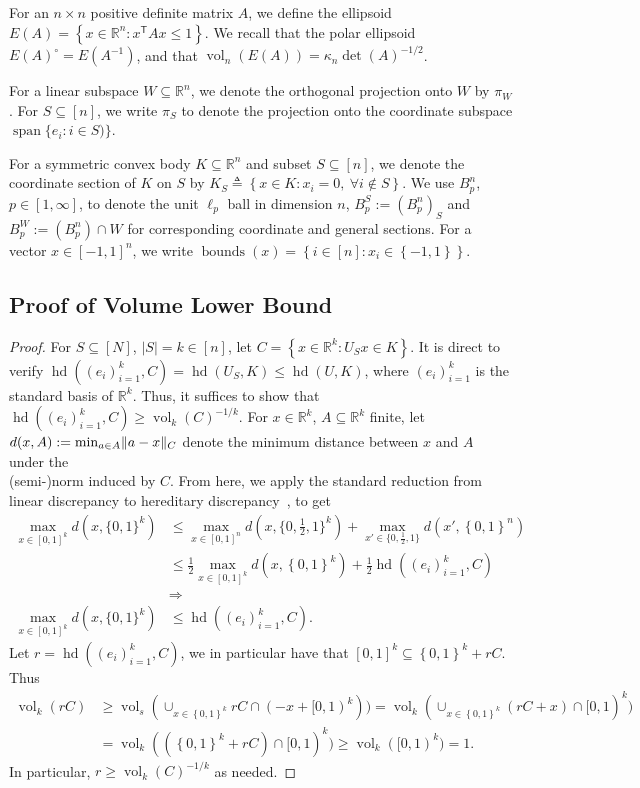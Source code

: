 \documentclass[11pt]{article}
\newcommand{\R}{{\mathbb{R}}}
\newcommand{\T}{\mathsf T}
\newcommand{\eqdef}{\triangleq}
\newcommand{\set}[1]{\left\{ #1 \right\}}
\DeclareMathOperator{\hd}{hd}
\DeclareMathOperator{\vol}{vol}
\DeclareMathOperator{\lspan}{span}
\DeclareMathOperator{\bnds}{bounds}
\DeclarePairedDelimiter\norm{\lVert}{\rVert}
\begin{document}
For an $n \times n$ positive definite matrix $A$, we define the ellipsoid $E(A)
= \set{x \in \R^n: x^\T A x \leq 1}$. We recall that the polar ellipsoid
$E(A)^\circ = E(A^{-1})$, and that $\vol_n(E(A)) = \kappa_n \det(A)^{-1/2}$.

For a linear subspace $W \subseteq \R^n$, we denote the orthogonal projection
onto $W$ by $\pi_W$. For $S \subseteq [n]$, we write $\pi_S$ to denote the
projection onto the coordinate subspace $\lspan\{e_i: i \in S)\}$.

For a symmetric convex body $K \subseteq \R^n$ and subset $S \subseteq [n]$, we
denote the coordinate section of $K$ on $S$ by $K_S \eqdef \set{x \in K: x_i =
0, ~\forall i \notin S}$. We use $B_p^n$, $p \in [1,\infty]$, to denote the unit
$\ell_p$ ball in dimension $n$, $B_p^S := (B_p^n)_S$ and $B_p^W := (B_p^n) \cap W$
for corresponding coordinate and general sections. For a vector $x \in
[-1,1]^n$, we write $\bnds(x) = \set{i \in [n]: x_i \in \set{-1,1}}$.

\subsection{Proof of Volume Lower Bound}
\label{sec:proof-vollb}

\vollbstat*
\begin{proof}
For $S \subseteq [N]$, $|S| = k \in [n]$, let $C = \set{x \in \R^k: U_S x \in
K}$. It is direct to verify $\hd((e_i)_{i=1}^k,C) = \hd(U_S,K) \leq \hd(U,K)$,
where $(e_i)_{i=1}^k$ is the standard basis of $\R^k$. Thus, it suffices to
show that $\hd((e_i)_{i=1}^k,C) \geq \vol_k(C)^{-1/k}$. For $x \in \R^k$, $A
\subseteq \R^k$ finite, let $d(x,A) := \min_{a \in A} \norm{a-x}_C$
denote the minimum distance between $x$ and $A$ under the \\ (semi-)norm induced by
$C$. From here, we apply the standard reduction from linear discrepancy to
hereditary discrepancy~\cite{LSV}, to get
\begin{align*}
\max_{x \in [0,1]^k} d(x,\{0,1\}^k) &\leq \max_{x \in [0,1]^n}
d(x,\{0,\tfrac12,1\}^k) + \max_{x' \in \{0,\tfrac12,1\}} d(x',\set{0,1}^n) \\
&\leq \frac{1}{2} \max_{x \in [0,1]^k} d(x,\set{0,1}^k) + \frac{1}{2}
\hd((e_i)_{i=1}^k,C) \\
&\Rightarrow \\
\max_{x \in [0,1]^k} d(x,\{0,1\}^k) &\leq \hd((e_i)_{i=1}^k,C).
\end{align*}
Let $r = \hd((e_i)_{i=1}^k,C)$, we in particular have that $[0,1]^k \subseteq
\set{0,1}^k + rC$. Thus
\begin{align*}
\vol_k(rC) &\geq \vol_s(\cup_{x \in \set{0,1}^k} rC \cap (-x+[0,1)^k)) 
             = \vol_k(\cup_{x \in \set{0,1}^k} (rC+x) \cap [0,1)^k) \\
             &= \vol_k((\set{0,1}^k+rC) \cap [0,1)^k) 
              \geq \vol_k([0,1)^k) = 1 .
\end{align*}
In particular, $r \geq \vol_k(C)^{-1/k}$ as needed.
\end{proof}
\end{document}
